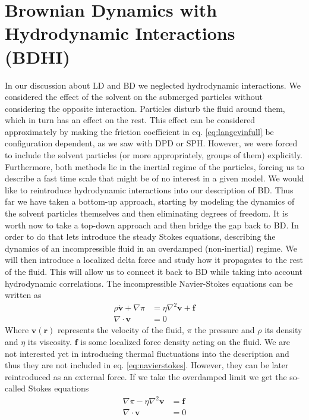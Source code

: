 \documentclass[ twoside,openright,titlepage,numbers=noenddot,%
headinclude,footinclude,cleardoublepage=empty,abstract=on,
BCOR=5mm,paper=a4,fontsize=11pt, dvipsnames
]{scrreprt}
\renewcommand{\vec}[1]{\bm{#1}}
\newcommand{\fpos}{r}
\newcommand{\fvel}{v}
\begin{document}
\section{Brownian Dynamics with Hydrodynamic Interactions (BDHI)}
In our discussion about \gls{LD} and \gls{BD} we neglected hydrodynamic interactions. We considered the effect of the solvent on the submerged particles without considering the opposite interaction. Particles disturb the fluid around them, which in turn has an effect on the rest. This effect can be considered approximately by making the friction coefficient in eq. \eqref{eq:langevinfull} be configuration dependent, as we saw with \gls{DPD} or \gls{SPH}. However, we were forced to include the solvent particles (or more appropriately, groups of them) explicitly. Furthermore, both methods lie in the inertial regime of the particles, forcing us to describe a fast time scale that might be of no interest in a given model.
We would like to reintroduce hydrodynamic interactions into our description of \gls{BD}. Thus far we have taken a bottom-up approach, starting by modeling the dynamics of the solvent particles themselves and then eliminating degrees of freedom. It is worth now to take a top-down approach and then bridge the gap back to \gls{BD}.
In order to do that lets introduce the steady Stokes equations, describing the dynamics of an incompressible fluid in an overdamped (non-inertial) regime. We will then introduce a localized delta force and study how it propagates to the rest of the fluid. This will allow us to connect it back to \gls{BD} while taking into account hydrodynamic correlations.
The incompressible Navier-Stokes equations can be written as
\begin{equation}
  \label{eq:navierstokes}
  \begin{aligned}
    \rho\dot{\vec{\fvel}} + \nabla \pi &= \eta \nabla^2\vec{\fvel} + \vec{f}\\
    \nabla\cdot\vec{\fvel} &= 0
  \end{aligned}
\end{equation}
Where $\vec{\fvel}(\vec{\fpos})$ represents the velocity of the fluid, $\pi$ the pressure and $\rho$ its density and $\eta$ its viscosity. $\vec{f}$ is some localized force density acting on the fluid.
We are not interested yet in introducing thermal fluctuations into the description and thus they are not included in eq. \eqref{eq:navierstokes}. However, they can be later reintroduced as an external force.
If we take the overdamped limit we get the so-called Stokes equations
\begin{equation}
  \label{eq:stokes}
  \begin{aligned}
    \nabla \pi - \eta \nabla^2\vec{\fvel} &=  \vec{f}\\
    \nabla\cdot\vec{\fvel} &= 0
  \end{aligned}  
\end{equation}
\end{document}
